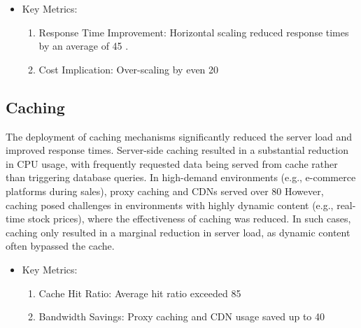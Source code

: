 \documentclass{article}
\begin{document}
\begin{itemize}
    \item Key Metrics:
    \begin{enumerate}
        \item Response Time Improvement: Horizontal scaling reduced response times by an average of 45%
.
        \item Cost Implication: Over-scaling by even 20%

    \end{enumerate}
\end{itemize}

\subsection{Caching}
The deployment of caching mechanisms significantly reduced the server load and improved response times. Server-side caching resulted in a substantial reduction in CPU usage, with frequently requested data being served from cache rather than triggering database queries.
In high-demand environments (e.g., e-commerce platforms during sales), proxy caching and CDNs served over 80%
However, caching posed challenges in environments with highly dynamic content (e.g., real-time stock prices), where the effectiveness of caching was reduced. In such cases, caching only resulted in a marginal reduction in server load, as dynamic content often bypassed the cache.

\begin{itemize}
    \item Key Metrics:
    \begin{enumerate}
        \item Cache Hit Ratio: Average hit ratio exceeded 85%
        \item Bandwidth Savings: Proxy caching and CDN usage saved up to 40%
    \end{enumerate}
\end{itemize}
\end{document}
